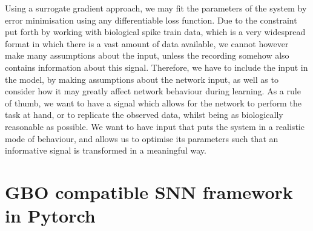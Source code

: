 \documentclass[mphil,deptreport,ai]{infthesis} %
\begin{document}
Using a surrogate gradient approach, we may fit the parameters of the system by error minimisation using any differentiable loss function. Due to the constraint put forth by working with biological spike train data, which is a very widespread format in which there is a vast amount of data available, we cannot however make many assumptions about the input, unless the recording somehow also contains information about this signal. 
Therefore, we have to include the input in the model, by making assumptions about the network input, as well as to consider how it may greatly affect network behaviour during learning. As a rule of thumb, we want to have a signal which allows for the network to perform the task at hand, or to replicate the observed data, whilst being as biologically reasonable as possible.
We want to have input that puts the system in a realistic mode of behaviour, and allows us to optimise its parameters such that an informative signal is transformed in a meaningful way.




\section{GBO compatible SNN framework in Pytorch}
\end{document}
